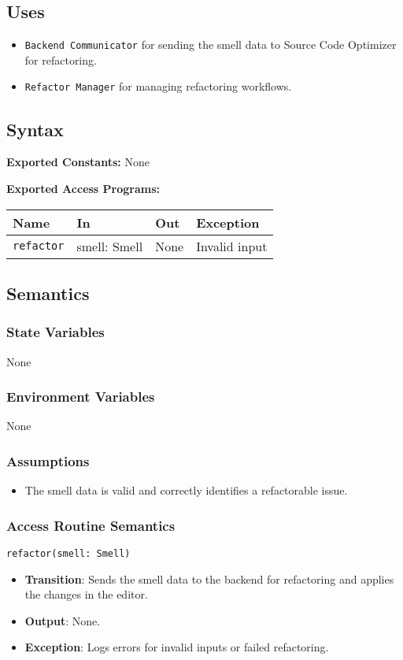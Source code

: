 \documentclass[12pt, titlepage]{article}
\begin{document}
\subsection{Uses}
\begin{itemize}
\item \texttt{Backend Communicator} for sending the smell data to Source Code Optimizer for refactoring.
\item \texttt{Refactor Manager} for managing refactoring workflows.
\end{itemize}

\subsection{Syntax}

\textbf{Exported Constants:} None

\textbf{Exported Access Programs:}\\
\begin{tabularx}{\linewidth}{|l|>{\raggedright\arraybackslash}X|l|l|}
  \hline
  \textbf{Name} & \textbf{In} & \textbf{Out} & \textbf{Exception}\\
  \hline
  \texttt{refactor} & {smell: Smell} & None & Invalid input \\
  \hline
\end{tabularx}

\subsection{Semantics}

\subsubsection{State Variables}
None

\subsubsection{Environment Variables}
None


\subsubsection{Assumptions}
\begin{itemize}
\item The smell data is valid and correctly identifies a refactorable issue.
\end{itemize}

\subsubsection{Access Routine Semantics}
\texttt{refactor(smell: Smell)}
\begin{itemize}
\item \textbf{Transition}: Sends the smell data to the backend for refactoring and applies the changes in the editor.
\item \textbf{Output}: None.
\item \textbf{Exception}: Logs errors for invalid inputs or failed refactoring.
\end{itemize}
\end{document}
